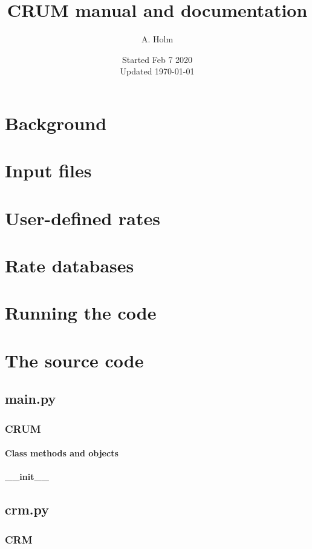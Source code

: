 \documentclass[10pt,a4paper]{article}
\author{A. Holm}
\title{CRUM manual and documentation}
\date{Started Feb 7 2020 \\ Updated \today}
\begin{document}
\maketitle

\section{Background}

\section{Input files}

\section{User-defined rates}

\section{Rate databases}

\section{Running the code}

\section{The source code}

\subsection{main.py}
\subsubsection{CRUM}
\paragraph{Class methods and objects}
\paragraph{\_\_init\_\_}

\subsection{crm.py}
\subsubsection{CRM}
\end{document}
